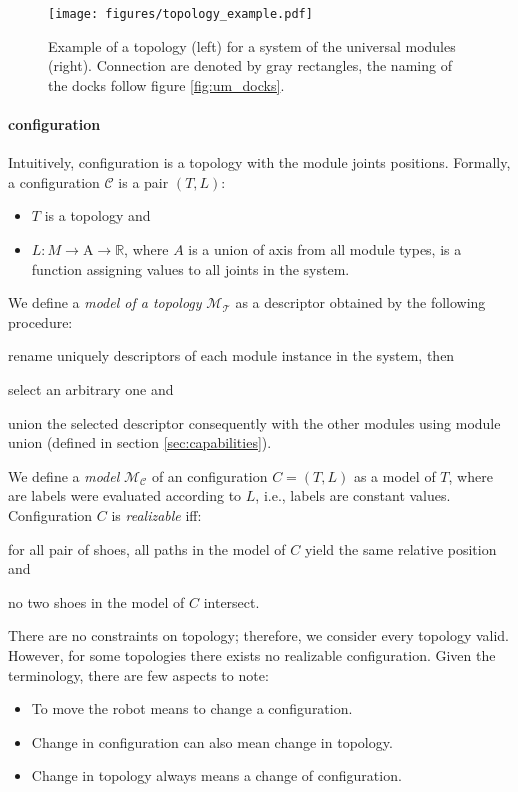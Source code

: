 \begin{figure}[t]
    \centering
    \texttt{[image: figures/topology\_example.pdf]}
    \caption{Example of a topology (left) for a system of the universal modules
    (right). Connection are denoted by gray rectangles, the naming of the docks
    follow figure \ref{fig:um_docks}. }
    \label{fig:topology_example}
\end{figure}

\paragraph{configuration} Intuitively, configuration is a topology with the
 module joints positions. Formally, a configuration $\mathcal{C}$ is a pair $(T,
 L)$:
 \begin{itemize}
    \item $T$ is a topology and
    \item $L: M \rightarrow \text{A} \rightarrow \mathds{R}$, where $A$ is a
    union of axis from all module types, is a function assigning values to all
    joints in the system.
 \end{itemize}

We define a \emph{model of a topology} $\mathcal{M}_\mathcal{T}$ as a descriptor
obtained by the following procedure:
\begin{enumerate*}
    \item rename uniquely descriptors of each module instance in the system, then
    \item select an arbitrary one and
    \item union the selected descriptor consequently with the other modules
    using module union (defined in section \ref{sec:capabilities}).
\end{enumerate*}
We define a \emph{model} $\mathcal{M}_\mathcal{C}$ of an configuration
$C=(T, L)$ as a model of $T$, where are labels were evaluated according to $L$,
i.e., labels are constant values. Configuration $C$ is \emph{realizable} iff:
\begin{enumerate*}
    \item for all pair of shoes, all paths in the model of $C$ yield the same
    relative position and
    \item no two shoes in the model of $C$ intersect.
\end{enumerate*}

There are no constraints on topology; therefore, we consider every topology
valid. However, for some topologies there exists no realizable configuration.
Given the terminology, there are few aspects to note:
\begin{itemize}
    \item To move the robot means to change a configuration.
    \item Change in configuration can also mean change in topology.
    \item Change in topology always means a change of configuration.
\end{itemize}


